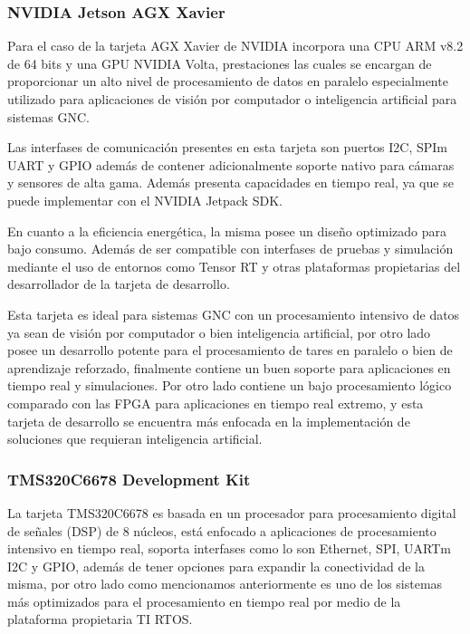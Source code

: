 \subsubsection{NVIDIA Jetson AGX Xavier}

Para el caso de la tarjeta AGX Xavier de NVIDIA incorpora una CPU ARM v8.2 de 64 bits y una GPU NVIDIA Volta, prestaciones las cuales se encargan de proporcionar un alto nivel de procesamiento de datos en paralelo especialmente utilizado para aplicaciones de visión por computador o inteligencia artificial para sistemas GNC. 

Las interfases de comunicación presentes en esta tarjeta son puertos I2C, SPIm UART y GPIO además de contener adicionalmente soporte nativo para cámaras y sensores de alta gama. Además presenta capacidades en tiempo real, ya que se puede implementar con el NVIDIA Jetpack SDK. 

En cuanto a la eficiencia energética, la misma posee un diseño optimizado para bajo consumo. Además de ser compatible con interfases de pruebas y simulación mediante el uso de entornos como Tensor RT y otras plataformas propietarias del desarrollador de la tarjeta de desarrollo.

Esta tarjeta es ideal para sistemas GNC con un procesamiento intensivo de datos ya sean de visión por computador o bien inteligencia artificial, por otro lado posee un desarrollo potente para el procesamiento de tares en paralelo o bien de aprendizaje reforzado, finalmente contiene un buen soporte para aplicaciones en tiempo real y simulaciones. Por otro lado contiene un bajo procesamiento lógico comparado con las FPGA para aplicaciones en tiempo real extremo, y esta tarjeta de desarrollo se encuentra más enfocada en la implementación de soluciones que requieran inteligencia artificial.

\subsubsection{TMS320C6678 Development Kit}

La tarjeta TMS320C6678 es basada en un procesador para procesamiento digital de señales (DSP) de 8 núcleos, está enfocado a aplicaciones de procesamiento intensivo en tiempo real, soporta
interfases como lo son Ethernet, SPI, UARTm I2C y GPIO, además de tener opciones para expandir la conectividad de la misma, por otro lado como mencionamos anteriormente es uno de los sistemas
más optimizados para el procesamiento en tiempo real por medio de la plataforma propietaria TI RTOS.


